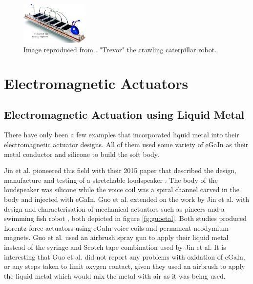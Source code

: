 \documentclass[a4paper,12pt]{article}
\begin{document}
\begin{figure}[h!]
    \centering
    \includegraphics[width=0.3\textwidth]{catepillar.png}
    \caption{Image reproduced from \cite{henkeSoftDielectricElastomer2017}. "Trevor" the crawling caterpillar robot.}
    \label{fg:catepillar}
\end{figure}

\section{Electromagnetic Actuators}

\subsection{Electromagnetic Actuation using Liquid Metal}
There have only been a few examples that incorporated liquid metal into their electromagnetic actuator designs. All of them used some variety of eGaIn as their metal conductor and silicone to build the soft body.

Jin et al. pioneered this field with their 2015 paper that described the design, manufacture and testing of a stretchable loudspeaker \cite{jinStretchableLoudspeakerUsing2015}. The body of the loudspeaker was silicone while the voice coil was a spiral channel carved in the body and injected with eGaIn. Guo et al. extended on the work by Jin et al. with design and characterisation of mechanical actuators such as pincers and a swimming fish robot \cite{guoLiquidMetalSpiral2018}, both depicted in figure \ref{fg:guoetal}. Both studies produced Lorentz force actuators using eGaIn voice coils and permanent neodymium magnets. Guo et al. used an airbrush spray gun to apply their liquid metal instead of the syringe and Scotch tape combination used by Jin et al. It is interesting that Guo et al. did not report any problems with oxidation of eGaIn, or any steps taken to limit oxygen contact, given they used an airbrush to apply the liquid metal which would mix the metal with air as it was being used.
\end{document}
